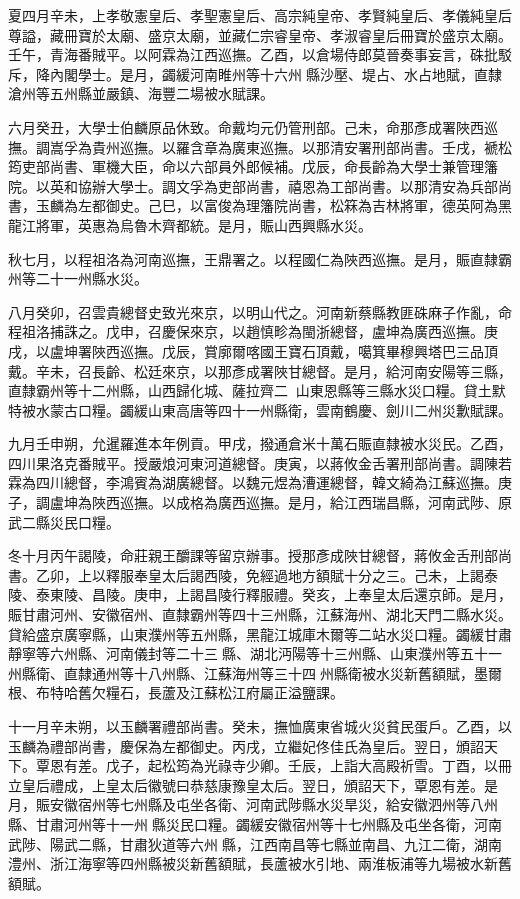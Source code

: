 \begin{pinyinscope}
夏四月辛未，上孝敬憲皇后、孝聖憲皇后、高宗純皇帝、孝賢純皇后、孝儀純皇后尊謚，藏冊寶於太廟、盛京太廟，並藏仁宗睿皇帝、孝淑睿皇后冊寶於盛京太廟。壬午，青海番賊平。以阿霖為江西巡撫。乙酉，以倉場侍郎莫晉奏事妄言，硃批駁斥，降內閣學士。是月，蠲緩河南睢州等十六州縣沙壓、堤占、水占地賦，直隸滄州等五州縣並嚴鎮、海豐二場被水賦課。

六月癸丑，大學士伯麟原品休致。命戴均元仍管刑部。己未，命那彥成署陜西巡撫。調嵩孚為貴州巡撫。以羅含章為廣東巡撫。以那清安署刑部尚書。壬戌，褫松筠吏部尚書、軍機大臣，命以六部員外郎候補。戊辰，命長齡為大學士兼管理籓院。以英和協辦大學士。調文孚為吏部尚書，禧恩為工部尚書。以那清安為兵部尚書，玉麟為左都御史。己巳，以富俊為理籓院尚書，松箖為吉林將軍，德英阿為黑龍江將軍，英惠為烏魯木齊都統。是月，賑山西興縣水災。

秋七月，以程祖洛為河南巡撫，王鼎署之。以程國仁為陜西巡撫。是月，賑直隸霸州等二十一州縣水災。

八月癸卯，召雲貴總督史致光來京，以明山代之。河南新蔡縣教匪硃麻子作亂，命程祖洛捕誅之。戊申，召慶保來京，以趙慎畛為閩浙總督，盧坤為廣西巡撫。庚戌，以盧坤署陜西巡撫。戊辰，賞廓爾喀國王寶石頂戴，噶箕畢穆興塔巴三品頂戴。辛未，召長齡、松廷來京，以那彥成署陜甘總督。是月，給河南安陽等三縣，直隸霸州等十二州縣，山西歸化城、薩拉齊二，山東恩縣等三縣水災口糧。貸土默特被水蒙古口糧。蠲緩山東高唐等四十一州縣衛，雲南鶴慶、劍川二州災歉賦課。

九月壬申朔，允暹羅進本年例貢。甲戌，撥通倉米十萬石賑直隸被水災民。乙酉，四川果洛克番賊平。授嚴烺河東河道總督。庚寅，以蔣攸金舌署刑部尚書。調陳若霖為四川總督，李鴻賓為湖廣總督。以魏元煜為漕運總督，韓文綺為江蘇巡撫。庚子，調盧坤為陜西巡撫。以成格為廣西巡撫。是月，給江西瑞昌縣，河南武陟、原武二縣災民口糧。

冬十月丙午謁陵，命莊親王釂課等留京辦事。授那彥成陜甘總督，蔣攸金舌刑部尚書。乙卯，上以釋服奉皇太后謁西陵，免經過地方額賦十分之三。己未，上謁泰陵、泰東陵、昌陵。庚申，上謁昌陵行釋服禮。癸亥，上奉皇太后還京師。是月，賑甘肅河州、安徽宿州、直隸霸州等四十三州縣，江蘇海州、湖北天門二縣水災。貸給盛京廣寧縣，山東濮州等五州縣，黑龍江城庫木爾等二站水災口糧。蠲緩甘肅靜寧等六州縣、河南儀封等二十三縣、湖北沔陽等十三州縣、山東濮州等五十一州縣衛、直隸通州等十八州縣、江蘇海州等三十四州縣衛被水災新舊額賦，墨爾根、布特哈舊欠糧石，長蘆及江蘇松江府屬正溢鹽課。

十一月辛未朔，以玉麟署禮部尚書。癸未，撫恤廣東省城火災貧民蛋戶。乙酉，以玉麟為禮部尚書，慶保為左都御史。丙戌，立繼妃佟佳氏為皇后。翌日，頒詔天下。覃恩有差。戊子，起松筠為光祿寺少卿。壬辰，上詣大高殿祈雪。丁酉，以冊立皇后禮成，上皇太后徽號曰恭慈康豫皇太后。翌日，頒詔天下，覃恩有差。是月，賑安徽宿州等七州縣及屯坐各衛、河南武陟縣水災旱災，給安徽泗州等八州縣、甘肅河州等十一州縣災民口糧。蠲緩安徽宿州等十七州縣及屯坐各衛，河南武陟、陽武二縣，甘肅狄道等六州縣，江西南昌等七縣並南昌、九江二衛，湖南澧州、浙江海寧等四州縣被災新舊額賦，長蘆被水引地、兩淮板浦等九場被水新舊額賦。


\end{pinyinscope}
